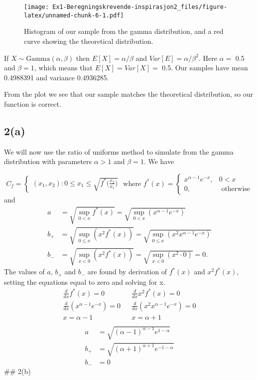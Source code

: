 \documentclass[
]{article}
\begin{document}
\begin{figure}
\centering
\texttt{[image: Ex1-Beregningskrevende-inspirasjon2\_files/figure-latex/unnamed-chunk-6-1.pdf]}
\caption{Histogram of our sample from the gamma distribution, and a red
curve showing the theoretical distribution.}
\end{figure}

If \(X\sim\text{Gamma}(\alpha, \beta)\) then \(E[X] = \alpha/\beta\) and
\(Var[E]=\alpha/\beta^2\). Here \(\alpha =\) 0.5 and \(\beta=1\), which
means that \(E[X]=Var[X]=\) 0.5. Our samples have mean 0.4988391 and
variance 0.4936285.

From the plot we see that our sample matches the theoretical
distribution, so our function is correct.

\hypertarget{a-3}{%
\subsection{2(a)}\label{a-3}}

We will now use the ratio of uniforms method to simulate from the gamma
distribution with parameters \(\alpha>1\) and \(\beta=1\). We have

\[
C_f=\begin{cases}(x_1,x_2):0\le x_1\le \sqrt{f^*\bigg(\frac{x_2}{x_1}\bigg)}
\end{cases} \text{ where } 
f^*(x)=\begin{cases}x^{\alpha-1}e^{-x},& 0<x\\
0, & \text{ otherwise}
\end{cases}
\] and \[
\begin{aligned}
a&=\sqrt{\sup_{0<x}f^*(x)}= \sqrt{\sup_{0<x}(x^{\alpha-1}e^{-x})} \\
b_+&=\sqrt{\sup_{0\le x}(x^2f^*(x))} =\sqrt{\sup_{0\le x}(x^2x^{\alpha-1}e^{-x})}\\
b_-&=\sqrt{\sup_{x<0}(x^2f^*(x))}=\sqrt{\sup_{x<0}(x^2\cdot0)} = 0.
\end{aligned}
\] The values of \(a\), \(b_+\) and \(b_-\) are found by derivation of
\(f^*(x)\) and \(x^2f^*(x)\), setting the equations equal to zero and
solving for x. \[
\begin{aligned}
\frac{d}{dx}f^*(x)=0 &&  \frac{d}{dx}x^2f^*(x)=0\\
\frac{d}{dx}(x^{\alpha-1}e^{-x})=0 && \frac{d}{dx}(x^2x^{\alpha-1}e^{-x})=0 \\
x=\alpha-1 && x=\alpha+1\\
\end{aligned}
\] \[
\begin{aligned}
a&=\sqrt{(\alpha-1)^{\alpha-1}e^{1-\alpha}}\\
b_+&=\sqrt{(\alpha+1)^{\alpha+1}e^{-1-\alpha}}\\
b_-& = 0
\end{aligned}
\] \#\# 2(b)
\end{document}
